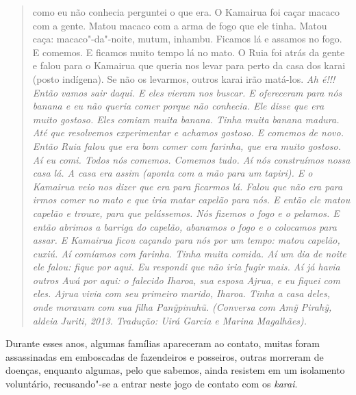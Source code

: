 \begin{quote}
{como eu não conhecia perguntei o que era. O Kamairua foi caçar macaco
com a gente. Matou macaco com a arma de fogo que ele tinha. Matou caça:
macaco"-da"-noite, mutum, inhambu. Ficamos lá e assamos no fogo. E
comemos. E ficamos muito tempo lá no mato. O Ruia foi atrás da gente e
falou para o Kamairua que queria nos levar para perto da casa dos karai
(posto indígena). Se não os levarmos, outros karai irão matá-los.}
\emph{Ah é!!! Então vamos sair daqui. E eles vieram nos buscar. E
ofereceram para nós banana e eu não queria comer porque não conhecia.
Ele disse que era muito gostoso. Eles comiam muita banana. Tinha muita
banana madura. Até que resolvemos experimentar e achamos gostoso. E
comemos de novo. Então Ruia falou que era bom comer com farinha, que era
muito gostoso. Aí eu comi. Todos nós comemos. Comemos tudo. Aí nós
construímos nossa casa lá. A casa era assim (aponta com a mão para um
tapiri). E o Kamairua veio nos dizer que era para ficarmos lá. Falou que
não era para irmos comer no mato e que iria matar capelão para nós. E
então ele matou capelão e trouxe, para que pelássemos. Nós fizemos o
fogo e o pelamos. E então abrimos a barriga do capelão, abanamos o fogo
e o colocamos para assar. E Kamairua ficou caçando para nós por um
tempo: matou capelão, cuxiú. Aí comíamos com farinha. Tinha muita
comida. Aí um dia de noite ele falou: fique por aqui. Eu respondi que
não iria fugir mais. Aí já havia outros Awá por aqui: o falecido Iharoa,
sua esposa Ajrua, e eu fiquei com eles. Ajrua vivia com seu primeiro
marido, Iharoa. Tinha a casa deles, onde moravam com sua filha
Panỹpinuhũ. (Conversa com Amỹ Pirahỹ, aldeia Juriti, 2013.
Tradução: Uirá Garcia e Marina Magalhães).}
\end{quote}

Durante esses anos, algumas famílias apareceram ao contato, muitas foram
assassinadas em emboscadas de fazendeiros e posseiros, outras morreram
de doenças, enquanto algumas, pelo que sabemos, ainda resistem em um
isolamento voluntário, recusando"-se a entrar neste jogo de contato com
os \emph{karai}.

